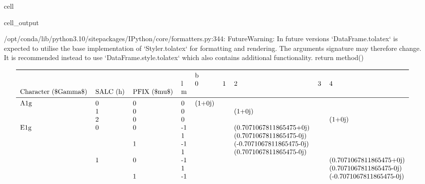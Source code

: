 \documentclass[letterpaper,table,10pt,english]{jupyterBook}
\begin{document}
\begin{sphinxuseclass}{cell}
\begin{sphinxVerbatimOutput}
\begin{sphinxuseclass}{cell_output}
\begin{sphinxVerbatim}[commandchars=\\\{\}]
/opt/conda/lib/python3.10/site\PYGZhy{}packages/IPython/core/formatters.py:344: FutureWarning: In future versions `DataFrame.to\PYGZus{}latex` is expected to utilise the base implementation of `Styler.to\PYGZus{}latex` for formatting and rendering. The arguments signature may therefore change. It is recommended instead to use `DataFrame.style.to\PYGZus{}latex` which also contains additional functionality.
  return method()
\end{sphinxVerbatim}
\begin{equation*}
\begin{split}\begin{tabular}{lllllllll}
\toprule
    &   &   & {} & \multicolumn{5}{l}{b} \\
    &   &   & l &       0 & 1 &                         2 & 3 &                         4 \\
Character (\$\textbackslash Gamma\$) & SALC (h) & PFIX (\$\textbackslash mu\$) & m &         &   &                           &   &                           \\
\midrule
A1g & 0 & 0 &  0 &  (1+0j) &   &                           &   &                           \\
    & 1 & 0 &  0 &         &   &                    (1+0j) &   &                           \\
    & 2 & 0 &  0 &         &   &                           &   &                    (1+0j) \\
E1g & 0 & 0 & -1 &         &   &   (0.7071067811865475+0j) &   &                           \\
    &   &   &  1 &         &   &   (0.7071067811865475-0j) &   &                           \\
    &   & 1 & -1 &         &   &  (-0.7071067811865475-0j) &   &                           \\
    &   &   &  1 &         &   &   (0.7071067811865475-0j) &   &                           \\
    & 1 & 0 & -1 &         &   &                           &   &   (0.7071067811865475+0j) \\
    &   &   &  1 &         &   &                           &   &   (0.7071067811865475-0j) \\
    &   & 1 & -1 &         &   &                           &   &  (-0.7071067811865475-0j) \\

\end{tabular}
\end{split}
\end{equation*}
\end{sphinxuseclass}
\end{sphinxVerbatimOutput}
\end{sphinxuseclass}
\end{document}
